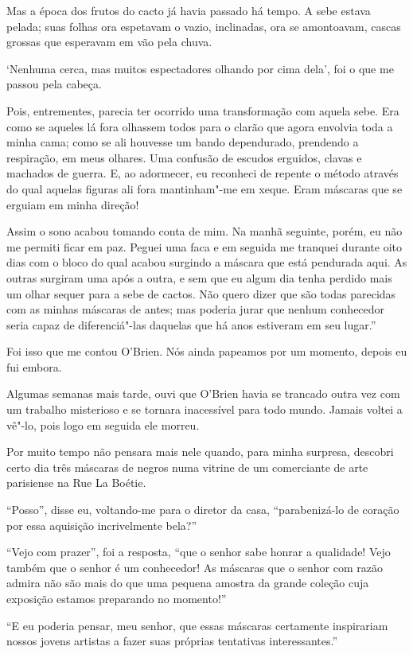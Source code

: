 Mas a época dos frutos do cacto já havia passado há tempo. A sebe estava
pelada; suas folhas ora espetavam o vazio, inclinadas, ora se
amontoavam, cascas grossas que esperavam em vão pela chuva.

`Nenhuma cerca, mas muitos espectadores olhando por cima dela', foi o
que me passou pela cabeça.

Pois, entrementes, parecia ter ocorrido uma transformação com aquela
sebe. Era como se aqueles lá fora olhassem todos para o clarão que agora
envolvia toda a minha cama; como se ali houvesse um bando dependurado,
prendendo a respiração, em meus olhares. Uma confusão de escudos
erguidos, clavas e machados de guerra. E, ao adormecer, eu reconheci de
repente o método através do qual aquelas figuras ali fora mantinham"-me
em xeque. Eram máscaras que se erguiam em minha direção!

Assim o sono acabou tomando conta de mim. Na manhã seguinte, porém, eu
não me permiti ficar em paz. Peguei uma faca e em seguida me tranquei
durante oito dias com o bloco do qual acabou surgindo a máscara que está
pendurada aqui. As outras surgiram uma após a outra, e sem que eu algum
dia tenha perdido mais um olhar sequer para a sebe de cactos. Não quero
dizer que são todas parecidas com as minhas máscaras de antes; mas
poderia jurar que nenhum conhecedor seria capaz de diferenciá"-las
daquelas que há anos estiveram em seu lugar.''

Foi isso que me contou O'Brien. Nós ainda papeamos por um momento,
depois eu fui embora.

Algumas semanas mais tarde, ouvi que O'Brien havia se trancado outra vez
com um trabalho misterioso e se tornara inacessível para todo mundo.
Jamais voltei a vê"-lo, pois logo em seguida ele morreu.

Por muito tempo não pensara mais nele quando, para minha surpresa,
descobri certo dia três máscaras de negros numa vitrine de um
comerciante de arte parisiense na Rue La Boétie.

``Posso'', disse eu, voltando-me para o diretor da casa, ``parabenizá-lo
de coração por essa aquisição incrivelmente bela?''

``Vejo com prazer'', foi a resposta, ``que o senhor sabe honrar a
qualidade! Vejo também que o senhor é um conhecedor! As máscaras que o
senhor com razão admira não são mais do que uma pequena amostra da
grande coleção cuja exposição estamos preparando no momento!''

``E eu poderia pensar, meu senhor, que essas máscaras certamente
inspirariam nossos jovens artistas a fazer suas próprias tentativas
interessantes.\label{supra8}''

